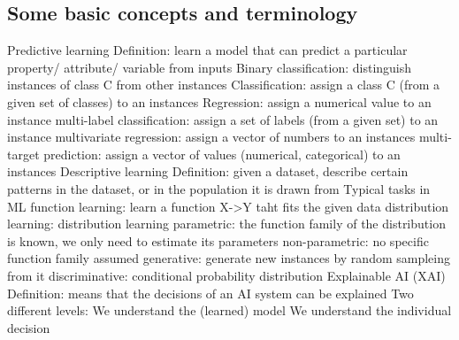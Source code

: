 \subsection{Some basic concepts and terminology}
\begin{outline}
    \1 Predictive learning
        \2 Definition: learn a model that can predict a particular property/ attribute/ variable from inputs
        \2 Binary classification: distinguish instances of class C from other instances
        \2 Classification: assign a class C (from a given set of classes) to an instances
        \2 Regression: assign a numerical value to an instance
        \2 multi-label classification: assign a set of labels (from a given set) to an instance
        \2 multivariate regression: assign a vector of numbers to an instances
        \2 multi-target prediction: assign a vector of values (numerical, categorical) to an instances
    \1 Descriptive learning
        \2 Definition: given a dataset, describe certain patterns in the dataset, or in the population it is drawn from
    \1 Typical tasks in ML
        \2 function learning: learn a function X->Y taht fits the given data
        \2 distribution learning: distribution learning
            \3 parametric: the function family of the distribution is known, we only need to estimate its parameters
            \3 non-parametric: no specific function family assumed
            \3 generative: generate new instances by random sampleing from it
            \3 discriminative: conditional probability distribution
    \1 Explainable AI (XAI)
        \2 Definition: means that the decisions of an AI system can be explained
        \2 Two different levels:
            \3 We understand the (learned) model
            \3 We understand the individual decision
\end{outline}

